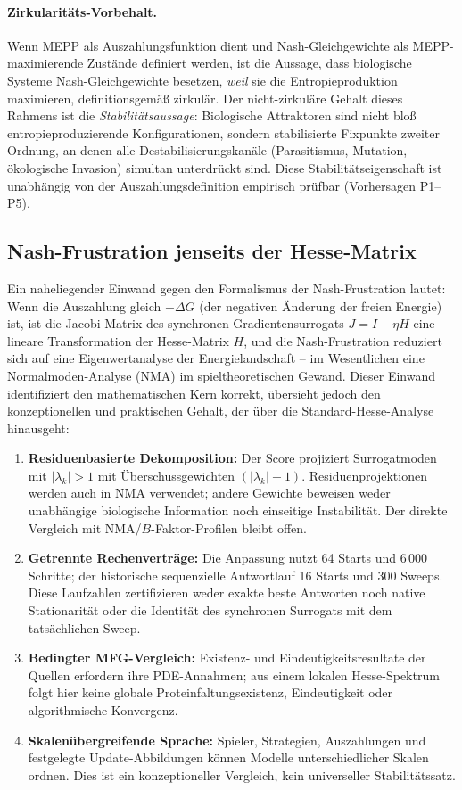 \documentclass[12pt,a4paper]{article}
\theoremstyle{remark}
\begin{document}
\paragraph{Zirkularitäts-Vorbehalt.} Wenn MEPP als Auszahlungsfunktion dient und Nash-Gleichgewichte als MEPP-maximierende Zustände definiert werden, ist die Aussage, dass biologische Systeme Nash-Gleichgewichte besetzen, \emph{weil} sie die Entropieproduktion maximieren, definitionsgemäß zirkulär. Der nicht-zirkuläre Gehalt dieses Rahmens ist die \emph{Stabilitätsaussage}: Biologische Attraktoren sind nicht bloß entropieproduzierende Konfigurationen, sondern stabilisierte Fixpunkte zweiter Ordnung, an denen alle Destabilisierungskanäle (Parasitismus, Mutation, ökologische Invasion) simultan unterdrückt sind. Diese Stabilitätseigenschaft ist unabhängig von der Auszahlungsdefinition empirisch prüfbar (Vorhersagen P1--P5).

\subsection{Nash-Frustration jenseits der Hesse-Matrix}

Ein naheliegender Einwand gegen den Formalismus der Nash-Frustration lautet: Wenn die Auszahlung gleich $-\Delta G$ (der negativen Änderung der freien Energie) ist, ist die Jacobi-Matrix des synchronen Gradientensurrogats $J = I - \eta H$ eine lineare Transformation der Hesse-Matrix $H$, und die Nash-Frustration reduziert sich auf eine Eigenwertanalyse der Energielandschaft -- im Wesentlichen eine Normalmoden-Analyse (NMA) im spieltheoretischen Gewand. Dieser Einwand identifiziert den mathematischen Kern korrekt, übersieht jedoch den konzeptionellen und praktischen Gehalt, der über die Standard-Hesse-Analyse hinausgeht:

\begin{enumerate}
    \item \textbf{Residuenbasierte Dekomposition:} Der Score projiziert Surrogatmoden mit $|\lambda_k|>1$ mit Überschussgewichten $(|\lambda_k|-1)$. Residuenprojektionen werden auch in NMA verwendet; andere Gewichte beweisen weder unabhängige biologische Information noch einseitige Instabilität. Der direkte Vergleich mit NMA/$B$-Faktor-Profilen bleibt offen.
    \item \textbf{Getrennte Rechenverträge:} Die Anpassung nutzt 64 Starts und 6\,000 Schritte; der historische sequenzielle Antwortlauf 16 Starts und 300 Sweeps. Diese Laufzahlen zertifizieren weder exakte beste Antworten noch native Stationarität oder die Identität des synchronen Surrogats mit dem tatsächlichen Sweep.
    \item \textbf{Bedingter MFG-Vergleich:} Existenz- und Eindeutigkeitsresultate der Quellen erfordern ihre PDE-Annahmen; aus einem lokalen Hesse-Spektrum folgt hier keine globale Proteinfaltungsexistenz, Eindeutigkeit oder algorithmische Konvergenz.
    \item \textbf{Skalenübergreifende Sprache:} Spieler, Strategien, Auszahlungen und festgelegte Update-Abbildungen können Modelle unterschiedlicher Skalen ordnen. Dies ist ein konzeptioneller Vergleich, kein universeller Stabilitätssatz.
\end{enumerate}
\end{document}
